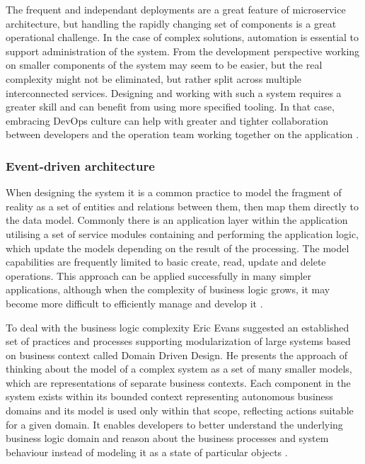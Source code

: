 The frequent and independant deployments are a great feature of microservice architecture, but handling the rapidly changing set of components is a great operational challenge. In the case of complex solutions, automation is essential to support administration of the system. From the development perspective working on smaller components of the system may seem to be easier, but the real complexity might not be eliminated, but rather split across multiple interconnected services. Designing and working with such a system requires a greater skill and can benefit from using more specified tooling. In that case, embracing DevOps culture can help with greater and tighter collaboration between developers and the operation team working together on the application \cite{FowlerMicroservicesTradeoffs}.

\subsubsection{Event-driven architecture}

When designing the system it is a common practice to model the fragment of reality as a set of entities and relations between them, then map them directly to the data model. Commonly there is an application layer within the application utilising a set of service modules containing and performing the application logic, which update the models depending on the result of the processing. The model capabilities are frequently limited to basic create, read, update and delete operations. This approach can be applied successfully in many simpler applications, although when the complexity of business logic grows, it may become more difficult to efficiently manage and develop it \cite{FowlerAnemicModel}.

To deal with the business logic complexity Eric Evans suggested an established set of practices and processes supporting modularization of large systems based on business context called Domain Driven Design. He presents the approach of thinking about the model of a complex system as a set of many smaller models, which are representations of separate business contexts. Each component in the system exists within its bounded context representing autonomous business domains and its model is used only within that scope, reflecting actions suitable for a given domain. It enables developers to better understand the underlying business logic domain and reason about the business processes and system behaviour instead of modeling it as a state of particular objects \cite{EvansDDD}.

